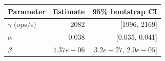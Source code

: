 \begin{tabular}{@{}lrr@{}}
\toprule
Parameter & Estimate & 95\% bootstrap CI \\
\midrule
$\gamma$ (ops/s) & 2082 & [1996, 2169] \\
$\alpha$ & 0.038 & [0.035, 0.041] \\
$\beta$ & $4.37e-06$ & [$3.2e-27$, $2.0e-05$] \\
\bottomrule
\end{tabular}
